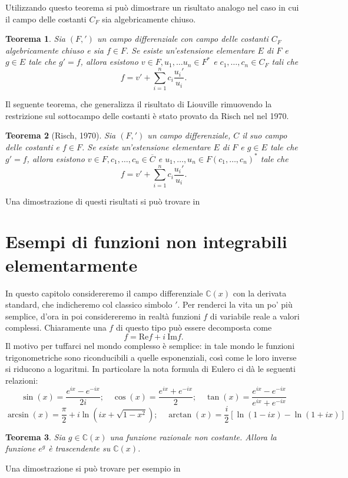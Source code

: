 \documentclass[10pt,oneside]{article}
\theoremstyle{definition}
\theoremstyle{plain}
\newtheorem{teo}{Teorema}
\theoremstyle{definition}
\theoremstyle{plain}
\theoremstyle{plain}
\newcommand{\C}{\mathbb{C}}
\begin{document}
Utilizzando questo teorema si può dimostrare un risultato analogo nel caso in cui il campo delle costanti $C_F$ sia algebricamente chiuso.
\begin{teo}
Sia $(F,')$ un campo differenziale con campo delle costanti $C_F$ algebricamente chiuso e sia $f \in F$. Se esiste un'estensione elementare $E$ di $F$ e $g \in E$ tale che $g'=f$, allora esistono $v \in F, u_1,\dots u_n \in F^*$ e $c_1,\dots, c_n \in C_F$ tali che
\[f = v' + \sum_{i=1}^n c_i \frac{u_i'}{u_i}. \]
\end{teo}
Il seguente teorema, che generalizza il risultato di Liouville rimuovendo la restrizione sul sottocampo delle costanti è stato provato da Risch nel nel 1970. 
\begin{teo}[Risch, 1970]Sia $(F,')$ un campo differenziale, $C$ il suo campo delle costanti e $f \in F$. Se esiste un'estensione elementare $E$ di $F$ e $g \in E$ tale che $g'=f$, allora esistono $v \in F, c_1,\dots ,c_n \in \overline{C}$ e $u_1, \dots, u_n \in F(c_1,\dots, c_n)^*$ tale che 
\[ f= v' + \sum_{i=1}^n c_i \frac{u_i'}{u_i}. \]
\end{teo}
Una dimostrazione di questi risultati si può trovare in \cite{Bro}
\section{Esempi di funzioni non integrabili elementarmente}
In questo capitolo considereremo il campo differenziale $\C(x)$ con la derivata standard, che indicheremo col classico simbolo $'$. Per renderci la vita un po' più semplice, d'ora in poi considereremo in realtà funzioni $f$ di variabile reale a valori complessi. Chiaramente una $f$ di questo tipo può essere decomposta come
 \[ f = \mathrm{Re} f  + i \  \mathrm{Im} f.\]
 Il motivo per tuffarci nel mondo complesso è semplice: in tale mondo le funzioni trigonometriche sono riconducibili a quelle esponenziali, così come le loro inverse si riducono a logaritmi. In particolare la nota formula di Eulero ci dà le seguenti relazioni:
  \[\sin(x)=\frac{e^{ix}-e^{-ix}}{2i}; \quad  \cos(x)=\frac{e^{ix}+e^{-ix}}{2}; \quad \tan(x)=\frac{e^{ix}-e^{-ix}}{e^{ix}+e^{-ix}} \]
  \[\arcsin(x)= \frac{\pi}{2} +i \ln (ix+\sqrt{1-x^2}); \quad \arctan(x)=\frac{i}{2} [\ln(1-ix)-\ln(1+ix)] \]

\begin{teo}
Sia $g \in \C(x)$ una funzione razionale non costante. Allora la funzione $e^g$ è trascendente su $\C(x)$.
\end{teo}
Una dimostrazione si può trovare per esempio in \cite{Delel}
\end{document}
